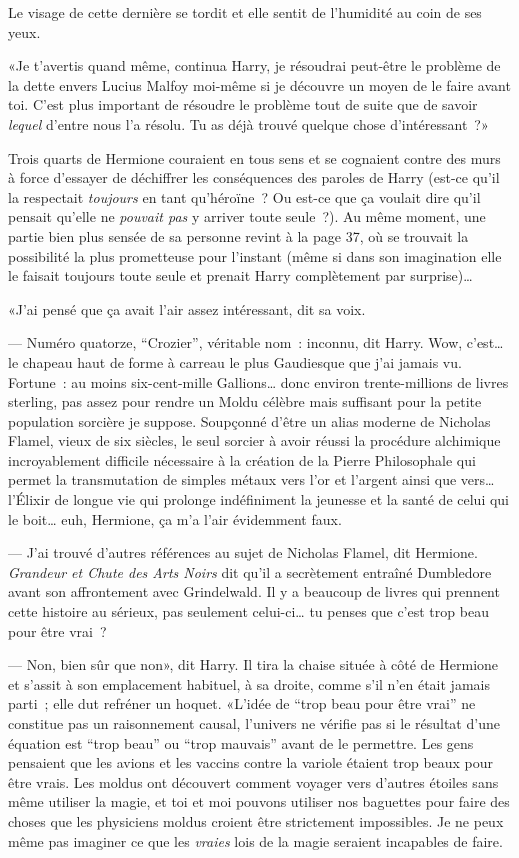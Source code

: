 Le visage de cette dernière se tordit et elle sentit de l'humidité au coin de ses yeux.

«Je t'avertis quand même, continua Harry, je résoudrai peut-être le problème de la dette envers Lucius Malfoy moi-même si je découvre un moyen de le faire avant toi. C'est plus important de résoudre le problème tout de suite que de savoir \emph{lequel} d'entre nous l'a résolu. Tu as déjà trouvé quelque chose d'intéressant~?»

Trois quarts de Hermione couraient en tous sens et se cognaient contre des murs à force d'essayer de déchiffrer les conséquences des paroles de Harry (est-ce qu'il la respectait \emph{toujours} en tant qu'héroïne~? Ou est-ce que ça voulait dire qu'il pensait qu'elle ne \emph{pouvait pas} y arriver toute seule~?). Au même moment, une partie bien plus sensée de sa personne revint à la page 37, où se trouvait la possibilité la plus prometteuse pour l'instant (même si dans son imagination elle le faisait toujours toute seule et prenait Harry complètement par surprise)…

«J'ai pensé que ça avait l'air assez intéressant, dit sa voix.

--- Numéro quatorze, “Crozier”, véritable nom~: inconnu, dit Harry. Wow, c'est… le chapeau haut de forme à carreau le plus Gaudiesque que j'ai jamais vu. Fortune~: au moins six-cent-mille Gallions… donc environ trente-millions de livres sterling, pas assez pour rendre un Moldu célèbre mais suffisant pour la petite population sorcière je suppose. Soupçonné d'être un alias moderne de Nicholas Flamel, vieux de six siècles, le seul sorcier à avoir réussi la procédure alchimique incroyablement difficile nécessaire à la création de la Pierre Philosophale qui permet la transmutation de simples métaux vers l'or et l'argent ainsi que vers… l'Élixir de longue vie qui prolonge indéfiniment la jeunesse et la santé de celui qui le boit… euh, Hermione, ça m'a l'air évidemment faux.

--- J'ai trouvé d'autres références au sujet de Nicholas Flamel, dit Hermione. \emph{Grandeur et Chute des Arts Noirs} dit qu'il a secrètement entraîné Dumbledore avant son affrontement avec Grindelwald. Il y a beaucoup de livres qui prennent cette histoire au sérieux, pas seulement celui-ci… tu penses que c'est trop beau pour être vrai~?

--- Non, bien sûr que non», dit Harry. Il tira la chaise située à côté de Hermione et s'assit à son emplacement habituel, à sa droite, comme s'il n'en était jamais parti~; elle dut refréner un hoquet. «L'idée de “trop beau pour être vrai” ne constitue pas un raisonnement causal, l'univers ne vérifie pas si le résultat d'une équation est “trop beau” ou “trop mauvais” avant de le permettre. Les gens pensaient que les avions et les vaccins contre la variole étaient trop beaux pour être vrais. Les moldus ont découvert comment voyager vers d'autres étoiles sans même utiliser la magie, et toi et moi pouvons utiliser nos baguettes pour faire des choses que les physiciens moldus croient être strictement impossibles. Je ne peux même pas imaginer ce que les \emph{vraies} lois de la magie seraient incapables de faire.

